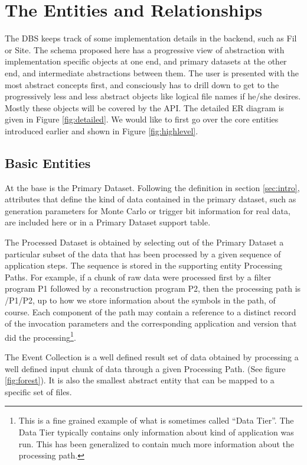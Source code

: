 \documentclass{cmspaper}
\begin{document}
\section{The Entities and Relationships}

The DBS keeps track of some implementation details in the backend, such as 
Fil or Site.
The schema proposed here has a progressive view of abstraction 
with implementation specific objects at one end, and primary datasets at the 
other end, and 
intermediate abstractions between them.  The user is presented with the most
abstract concepts first, and consciously has to drill 
down to get to the progressively less and less abstract objects like 
logical file names if he/she desires.  Mostly these objects will be covered by the
API.  The detailed ER diagram is given in Figure \ref{fig:detailed}. We 
would like to first go over the core entities introduced earlier and
shown in Figure \ref{fig:highlevel}.

\subsection{Basic Entities}

At the base is the Primary Dataset.  
Following the definition in section \ref{sec:intro},  
attributes that define the kind of data contained in the 
primary dataset, such as generation parameters for Monte Carlo or 
trigger bit information for real data, are included here or in a 
Primary Dataset support table.  

The Processed Dataset is obtained by 
selecting out of the Primary Dataset a particular subset of the data that has been 
processed by a given sequence of application steps.  The sequence is stored 
in the supporting entity Processing Paths.  For example,
if a chunk of raw data were processed first by a filter program P1 followed 
by a reconstruction program P2, then the processing path is /P1/P2, up to how we
store information about the symbols in the path, of course.  Each component 
of the path may contain a reference to a distinct record of the 
invocation parameters and the corresponding application and version that did 
the processing\footnote{This is a fine grained example of what is sometimes called
``Data Tier''.  The Data Tier typically contains only information about kind
of application was run.  This has been generalized to contain much more information 
about the processing path.}. 

The Event Collection is a well defined result set of data obtained by processing a 
well defined input chunk of data through a given Processing Path.  (See figure \ref{fig:forest}).
It is also the smallest abstract entity that can be mapped to a specific set of files.
\end{document}
